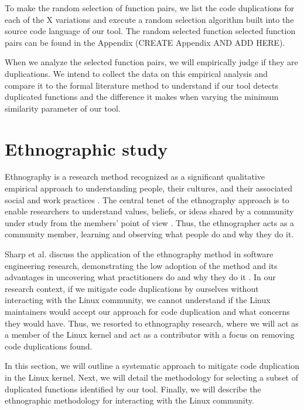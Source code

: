 To make the random selection of function pairs, we list the code duplications for each of the 
X variations and execute a random selection algorithm built into the source code language of 
our tool. The random selected function selected function pairs can 
be found in the Appendix (CREATE Appendix AND ADD HERE).

When we analyze the selected function pairs, we will empirically judge if they are duplications. 
We intend to collect the data on this empirical analysis and compare it to the formal literature 
method to understand if our tool detects duplicated functions and the difference it makes when 
varying the minimum similarity parameter of our tool.

\section{Ethnographic study}

\label{sec:meteth}

Ethnography is a research method recognized as a significant qualitative empirical approach to 
understanding people, their cultures, and their associated social and work practices \citep{bookethno}.
The central tenet of the ethnography approach is to enable researchers to understand values, 
beliefs, or ideas shared by a community under study from the members’ point of view 
\citep{ethnosoft}. Thus, the ethnographer acts as a community member, learning and observing 
what people do and why they do it.

Sharp et al. discuss the application of the ethnography method in software engineering research, 
demonstrating the low adoption of the method and its advantages in uncovering what practitioners 
do and why they do it \citep{ethnosoft}. In our research context, if we mitigate code 
duplications by ourselves without interacting with the Linux community, we cannot understand if 
the Linux maintainers would accept our approach for code duplication and what concerns they 
would have. Thus, we resorted to ethnography research, where we will act as a member of the 
Linux kernel and act as a contributor with a focus on removing code duplications found.

In this section, we will outline a systematic approach to mitigate code duplication in the 
Linux kernel. Next, we will detail the methodology for selecting a subset of duplicated functions 
identified by our tool. Finally, we will describe the ethnographic methodology for interacting 
with the Linux community.

